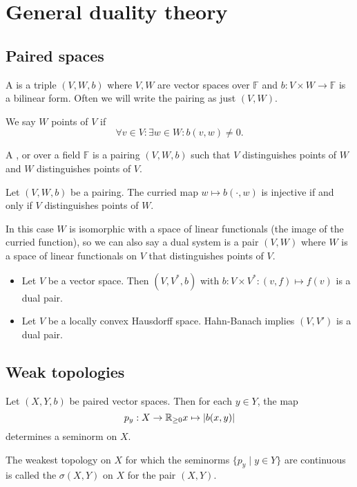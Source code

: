 \section{General duality theory}
\subsection{Paired spaces}
\begin{definition}
A  is a triple $(V,W, b)$ where $V,W$ are vector spaces over $\mathbb{F}$ and $b: V\times W\to \mathbb{F}$ is a bilinear form. Often we will write the pairing as just $(V,W)$.

We say $W$  points of $V$ if
\[ \forall v\in V: \exists w\in W: b(v,w) \neq 0. \]

A ,  or  over a field $\mathbb{F}$ is a pairing $(V,W,b)$ such that $V$ distinguishes points of $W$ and $W$ distinguishes points of $V$.
\end{definition}

\begin{lemma}
Let $(V,W, b)$ be a pairing. The curried map $w\mapsto b(\cdot, w)$ is injective \textup{if and only if} $V$ distinguishes points of $W$.
\end{lemma}
In this case $W$ is isomorphic with a space of linear functionals (the image of the curried function), so we can also say a dual system is a pair $(V,W)$ where $W$ is a space of linear functionals on $V$ that distinguishes points of $V$.

\begin{example}
\begin{itemize}
\item Let $V$ be a vector space. Then $(V,V^*, b)$ with $b:V\times V^*: (v,f)\mapsto f(v)$ is a dual pair.
\item Let $V$ be a locally convex Hausdorff space. Hahn-Banach implies $(V,V')$ is a dual pair.
\end{itemize}
\end{example}

\subsection{Weak topologies}
\begin{definition}
Let $(X,Y,b)$ be paired vector spaces. Then for each $y\in Y$, the map
\[ p_y: X\to \mathbb{R}_{\geq 0} x\mapsto |b(x,y)| \]
determines a seminorm on $X$.

The weakest topology on $X$ for which the seminorms $\{p_y\;|\;y\in Y\}$ are continuous is called the  $\sigma(X,Y)$ on $X$ for the pair $(X,Y)$.
\end{definition}

